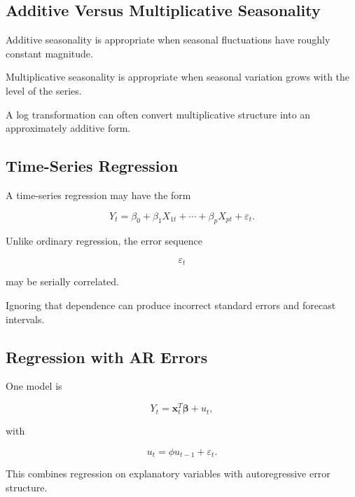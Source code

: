 \subsection{Additive Versus Multiplicative Seasonality}
\label{subsec:additive-multiplicative-seasonality}

Additive seasonality is appropriate when seasonal fluctuations have
roughly constant magnitude.

Multiplicative seasonality is appropriate when seasonal variation grows
with the level of the series.

A log transformation can often convert multiplicative structure into an
approximately additive form.

\subsection{Time-Series Regression}
\label{subsec:time-series-regression}

A time-series regression may have the form

\[
\boxed{
Y_t
=
\beta_0
+
\beta_1X_{1t}
+
\cdots
+
\beta_pX_{pt}
+
\varepsilon_t.
}
\]

Unlike ordinary regression, the error sequence

\[
\varepsilon_t
\]

may be serially correlated.

Ignoring that dependence can produce incorrect standard errors and
forecast intervals.

\subsection{Regression with AR Errors}
\label{subsec:regression-ar-errors}

One model is

\[
\boxed{
Y_t
=
\mathbf{x}_t^T
\boldsymbol{\beta}
+
u_t,
}
\]

with

\[
\boxed{
u_t
=
\phi u_{t-1}
+
\varepsilon_t.
}
\]

This combines regression on explanatory variables with autoregressive
error structure.

